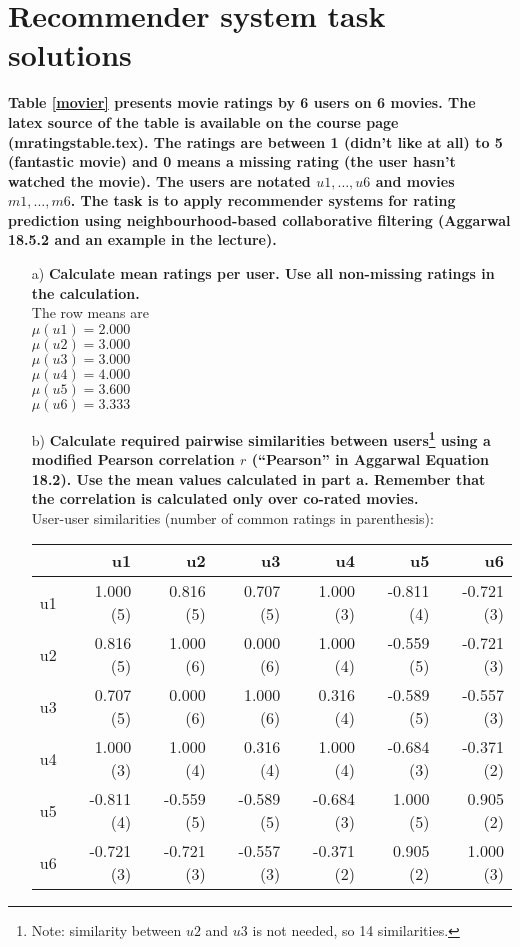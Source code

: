 \documentclass[a4paper,12pt]{article}
\begin{document}
\section*{Recommender system task solutions}


{\bf Table \ref{movier} presents movie ratings by 6 
users on 6 movies. The latex source of the table is available on the course 
page (mratingstable.tex). The ratings are between 1 (didn't like at all) to 5 
(fantastic movie) and 0 means a missing rating (the user hasn't watched 
the movie). The users are notated $u1,\hdots,u6$ and movies $m1,\hdots,m6$. 
The task is to apply recommender systems for rating  prediction using 
neighbourhood-based collaborative filtering (Aggarwal 18.5.2 and an 
example in the lecture).}

\begin{itemize}
\item[a)] {\bf  Calculate mean ratings per user. Use all non-missing ratings in the
calculation.}\\
The row means are\\
$\mu(u1)=2.000$\\
$\mu(u2)=3.000$\\
$\mu(u3)=3.000$\\
$\mu(u4)=4.000$\\
$\mu(u5)=3.600$\\
$\mu(u6)=3.333$

\item[b)] {\bf Calculate required pairwise similarities between
  users\footnote{Note: similarity between $u2$ and $u3$ is not needed,
    so 14 similarities.} using a modified Pearson correlation $r$
  (``Pearson'' in Aggarwal Equation 18.2). Use the mean values
  calculated in part a. Remember that the correlation is calculated
  only over co-rated movies.}\\


User-user similarities (number of common ratings in parenthesis):

\begin{center}
\begin{tabular}{|r|r|r|r|r|r|r|}
\hline
&u1&u2&u3&u4&u5&u6\\
\hline
u1&1.000 (5)&0.816 (5)&0.707 (5)&1.000 (3)&-0.811 (4)&-0.721 (3)\\
u2&0.816 (5)&1.000 (6)&0.000 (6)&1.000 (4)&-0.559 (5)&-0.721 (3)\\
u3&0.707 (5)&0.000 (6)&1.000 (6)&0.316 (4)&-0.589 (5)&-0.557 (3)\\
u4&1.000 (3)&1.000 (4)&0.316 (4)&1.000 (4)&-0.684 (3)&-0.371 (2)\\
u5&-0.811 (4)&-0.559 (5)&-0.589 (5)&-0.684 (3)&1.000 (5)&0.905 (2)\\
u6&-0.721 (3)&-0.721 (3)&-0.557 (3)&-0.371 (2)&0.905 (2)&1.000 (3)\\
\hline
\end{tabular}
\end{center}



\end{itemize}
\end{document}
